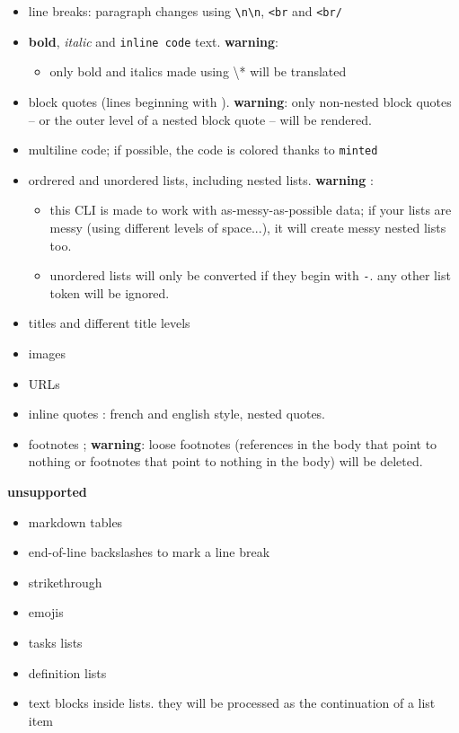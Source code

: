 \documentclass[a4paper, 12pt, twoside]{article}
\begin{document}
\begin{itemize}
\item line breaks: paragraph changes using \texttt{\textbackslash{}n\textbackslash{}n}, \texttt{<br} and \texttt{<br/}
\item \textbf{bold}, \textit{italic} and \texttt{inline code} text. \textbf{warning}:
\begin{itemize} 
 \item only bold and italics made using \textbackslash{}* will be translated
\end{itemize}
\item block quotes (lines beginning with \texttt{}). \textbf{warning}: only non-nested block quotes -- or the outer level of a nested block quote -- will be rendered.
\item multiline code; if possible, the code is colored thanks to \texttt{minted}
\item ordrered and unordered lists, including nested lists. \textbf{warning} : 
\begin{itemize} 
 \item this CLI is made to work with as-messy-as-possible data; if your lists are messy (using different levels of space...), it will create messy nested lists too.
\item unordered lists will only be converted if they begin with \texttt{-}. any other list token will be ignored.
\end{itemize}
\item titles and different title levels
\item images
\item URLs
\item inline quotes : french and english style, nested quotes.
\item footnotes ; \textbf{warning}: loose footnotes (references in the body that point to nothing or footnotes that point to nothing in the body) will be deleted. 
\end{itemize}

\textbf{unsupported}

\begin{itemize}
\item markdown tables
\item end-of-line backslashes to mark a line break
\item strikethrough
\item emojis
\item tasks lists
\item definition lists
\item text blocks inside lists. they will be processed as the continuation of a list item 
\end{itemize}
\end{document}
